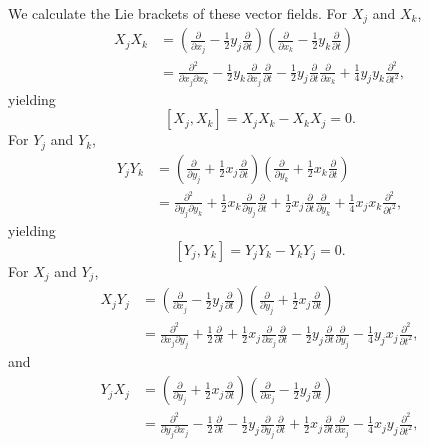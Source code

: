 \documentclass{article}
\theoremstyle{definition}
\begin{document}
We  calculate the Lie brackets of these vector fields. For $X_j$ and $X_k$,
\begin{align*}
X_j X_k &= \left(\frac{\partial}{\partial x_j} - \frac{1}{2}y_j \frac{\partial}{\partial t}\right)
\left( \frac{\partial}{\partial x_k} - \frac{1}{2}y_k \frac{\partial}{\partial t}\right)\\
&=\frac{\partial^2}{\partial x_j \partial x_k} - \frac{1}{2} y_k \frac{\partial}{\partial x_j} \frac{\partial}{\partial t}
-\frac{1}{2}y_j \frac{\partial}{\partial t} \frac{\partial}{\partial x_k} + \frac{1}{4} y_j y_k \frac{\partial^2}{\partial t^2},
\end{align*}
yielding
\[
[X_j,X_k] = X_jX_k-X_kX_j = 0.
\]
For $Y_j$ and $Y_k$,
\begin{align*}
Y_j Y_k&=\left( \frac{\partial}{\partial y_j} + \frac{1}{2}x_j \frac{\partial}{\partial t}\right)
\left( \frac{\partial}{\partial y_k} + \frac{1}{2}x_k \frac{\partial}{\partial t}\right)\\
&=\frac{\partial^2}{\partial y_j \partial y_k} +\frac{1}{2} x_k \frac{\partial}{\partial y_j} \frac{\partial}{\partial t}
+\frac{1}{2}x_j \frac{\partial}{\partial t} \frac{\partial}{\partial y_k}
+\frac{1}{4} x_jx_k \frac{\partial^2}{\partial t^2},
\end{align*}
yielding
\[
[Y_j,Y_k] = Y_jY_k-Y_kY_j=0.
\]
For $X_j$ and $Y_j$,
\begin{align*}
X_j Y_j&=\left( \frac{\partial}{\partial x_j} - \frac{1}{2}y_j \frac{\partial}{\partial t}\right)
\left(\frac{\partial}{\partial y_j} + \frac{1}{2}x_j \frac{\partial}{\partial t}\right)\\
&=\frac{\partial^2}{\partial x_j \partial y_j} +\frac{1}{2}\frac{\partial}{\partial t}
+\frac{1}{2} x_j \frac{\partial}{\partial x_j} \frac{\partial}{\partial t}
-\frac{1}{2}y_j \frac{\partial}{\partial t} \frac{\partial}{\partial y_j}
-\frac{1}{4}y_j x_j \frac{\partial^2}{\partial t^2},
\end{align*}
and
\begin{align*}
Y_jX_j&=\left(\frac{\partial}{\partial y_j} + \frac{1}{2}x_j \frac{\partial}{\partial t}\right)\left( \frac{\partial}{\partial x_j} - \frac{1}{2}y_j \frac{\partial}{\partial t}\right)\\
&=\frac{\partial^2}{\partial y_j \partial x_j} - \frac{1}{2}\frac{\partial}{\partial t}
-\frac{1}{2}y_j \frac{\partial}{\partial y_j} \frac{\partial}{\partial t}
+\frac{1}{2} x_j \frac{\partial}{\partial t} \frac{\partial}{\partial x_j}
-\frac{1}{4}x_jy_j \frac{\partial^2}{\partial t^2},
\end{align*}
\end{document}
